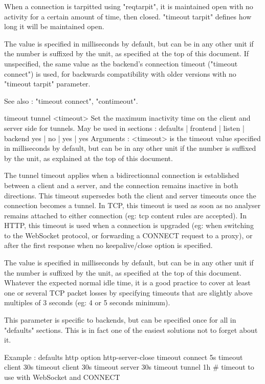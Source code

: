   When a connection is tarpitted using "reqtarpit", it is maintained open with
  no activity for a certain amount of time, then closed. "timeout tarpit"
  defines how long it will be maintained open.

  The value is specified in milliseconds by default, but can be in any other
  unit if the number is suffixed by the unit, as specified at the top of this
  document. If unspecified, the same value as the backend's connection timeout
  ("timeout connect") is used, for backwards compatibility with older versions
  with no "timeout tarpit" parameter.

  See also : "timeout connect", "contimeout".


timeout tunnel <timeout>
  Set the maximum inactivity time on the client and server side for tunnels.
  May be used in sections :   defaults | frontend | listen | backend
                                 yes   |    no    |   yes  |   yes
  Arguments :
    <timeout> is the timeout value specified in milliseconds by default, but
              can be in any other unit if the number is suffixed by the unit,
              as explained at the top of this document.

  The tunnel timeout applies when a bidirectionnal connection is established
  between a client and a server, and the connection remains inactive in both
  directions. This timeout supersedes both the client and server timeouts once
  the connection becomes a tunnel. In TCP, this timeout is used as soon as no
  analyser remains attached to either connection (eg: tcp content rules are
  accepted). In HTTP, this timeout is used when a connection is upgraded (eg:
  when switching to the WebSocket protocol, or forwarding a CONNECT request
  to a proxy), or after the first response when no keepalive/close option is
  specified.

  The value is specified in milliseconds by default, but can be in any other
  unit if the number is suffixed by the unit, as specified at the top of this
  document. Whatever the expected normal idle time, it is a good practice to
  cover at least one or several TCP packet losses by specifying timeouts that
  are slightly above multiples of 3 seconds (eg: 4 or 5 seconds minimum).

  This parameter is specific to backends, but can be specified once for all in
  "defaults" sections. This is in fact one of the easiest solutions not to
  forget about it.

  Example :
        defaults http
            option http-server-close
            timeout connect 5s
            timeout client 30s
            timeout client 30s
            timeout server 30s
            timeout tunnel  1h    # timeout to use with WebSocket and CONNECT


